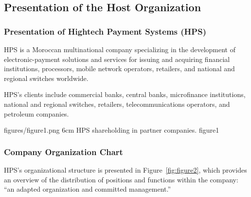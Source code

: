 \documentclass{classeENS}
\begin{document}
\subsection{Presentation of the Host Organization}

\subsubsection{Presentation of Hightech Payment Systems (HPS)}
HPS is a Moroccan multinational company specializing in the development of electronic-payment solutions and services for issuing and acquiring financial institutions, processors, mobile network operators, retailers, and national and regional switches worldwide. %

HPS's clients include commercial banks, central banks, microfinance institutions, national and regional switches, retailers, telecommunications operators, and petroleum companies. %

\insererfigure
{figures/figure1.png}
{6cm}
{HPS shareholding in partner companies.}
{figure1}

\subsubsection{Company Organization Chart}
HPS's organizational structure is presented in Figure~\ref{fig:figure2}, which provides an overview of the distribution of positions and functions within the company: ``an adapted organization and committed management.'' %
\end{document}
